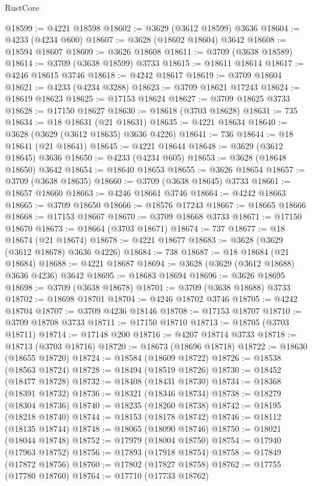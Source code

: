 \begin{lexlean}{RustCore}
\begin{coremodule}
@18599 := @4221 @18598
@18602 := @3629 (@3612 @18599) @3636
@18604 := @4233 (@4234 @600)
@18607 := @3628 (@18602 @18604) @3642
@18608 := @18594 @18607
@18609 := @3626 @18608
@18611 := @3709 (@3638 @18589)
@18614 := @3709 (@3638 @18599) @3733
@18615 := @18611 @18614
@18617 := @4246 @18615 @3746
@18618 := @4242 @18617
@18619 := @3709 @18604
@18621 := @4233 (@4234 @3288)
@18623 := @3709 @18621 @17243
@18624 := @18619 @18623
@18625 := @17153 @18624
@18627 := @3709 @18625 @3733
@18628 := @17150 @18627
@18630 := @18618 (@3703 @18628)
@18631 := 735
@18634 := @18 @18631 (@21 @18631)
@18635 := @4221 @18634
@18640 := @3628 (@3629 (@3612 @18635) @3636 @4226)
@18641 := 736
@18644 := @18 @18641 (@21 @18641)
@18645 := @4221 @18644
@18648 := @3629 (@3612 @18645) @3636
@18650 := @4233 (@4234 @605)
@18653 := @3628 (@18648 @18650) @3642
@18654 := @18640 @18653
@18655 := @3626 @18654
@18657 := @3709 (@3638 @18635)
@18660 := @3709 (@3638 @18645) @3733
@18661 := @18657 @18660
@18663 := @4246 @18661 @3746
@18664 := @4242 @18663
@18665 := @3709 @18650
@18666 := @18576 @17243
@18667 := @18665 @18666
@18668 := @17153 @18667
@18670 := @3709 @18668 @3733
@18671 := @17150 @18670
@18673 := @18664 (@3703 @18671)
@18674 := 737
@18677 := @18 @18674 (@21 @18674)
@18678 := @4221 @18677
@18683 := @3628 (@3629 (@3612 @18678) @3636 @4226)
@18684 := 738
@18687 := @18 @18684 (@21 @18684)
@18688 := @4221 @18687
@18694 := @3628 (@3629 (@3612 @18688) @3636 @4236) @3642
@18695 := @18683 @18694
@18696 := @3626 @18695
@18698 := @3709 (@3638 @18678)
@18701 := @3709 (@3638 @18688) @3733
@18702 := @18698 @18701
@18704 := @4246 @18702 @3746
@18705 := @4242 @18704
@18707 := @3709 @4236 @18146
@18708 := @17153 @18707
@18710 := @3709 @18708 @3733
@18711 := @17150 @18710
@18713 := @18705 (@3703 @18711)
@18714 := @17148 @200
@18716 := @4207 @18714 @3733
@18718 := @18713 (@3703 @18716)
@18720 := @18673 (@18696 @18718)
@18722 := @18630 (@18655 @18720)
@18724 := @18584 (@18609 @18722)
@18726 := @18538 (@18563 @18724)
@18728 := @18494 (@18519 @18726)
@18730 := @18452 (@18477 @18728)
@18732 := @18408 (@18431 @18730)
@18734 := @18368 (@18391 @18732)
@18736 := @18321 (@18346 @18734)
@18738 := @18279 (@18304 @18736)
@18740 := @18235 (@18260 @18738)
@18742 := @18195 (@18218 @18740)
@18744 := @18153 (@18178 @18742)
@18746 := @18112 (@18135 @18744)
@18748 := @18065 (@18090 @18746)
@18750 := @18021 (@18044 @18748)
@18752 := @17979 (@18004 @18750)
@18754 := @17940 (@17963 @18752)
@18756 := @17893 (@17918 @18754)
@18758 := @17849 (@17872 @18756)
@18760 := @17802 (@17827 @18758)
@18762 := @17755 (@17780 @18760)
@18764 := @17710 (@17733 @18762)

\end{coremodule}
\end{lexlean}
